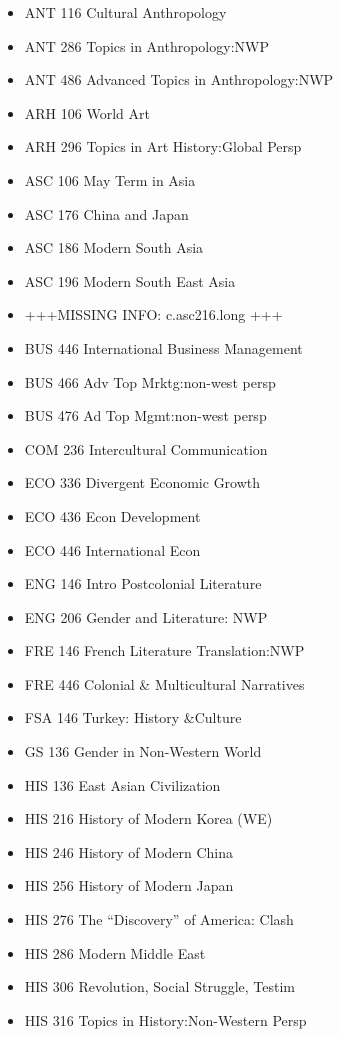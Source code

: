 \documentclass[
  letterpaper,
]{scrbook}
\providecommand{\tightlist}{%
  \setlength{\itemsep}{0pt}\setlength{\parskip}{0pt}}
\begin{document}
\begin{itemize}
\tightlist
\item
  ANT 116 Cultural Anthropology
\item
  ANT 286 Topics in Anthropology:NWP
\item
  ANT 486 Advanced Topics in Anthropology:NWP
\item
  ARH 106 World Art
\item
  ARH 296 Topics in Art History:Global Persp
\item
  ASC 106 May Term in Asia
\item
  ASC 176 China and Japan
\item
  ASC 186 Modern South Asia
\item
  ASC 196 Modern South East Asia
\item
  +++MISSING INFO: c.asc216.long +++
\item
  BUS 446 International Business Management
\item
  BUS 466 Adv Top Mrktg:non-west persp
\item
  BUS 476 Ad Top Mgmt:non-west persp
\item
  COM 236 Intercultural Communication
\item
  ECO 336 Divergent Economic Growth
\item
  ECO 436 Econ Development
\item
  ECO 446 International Econ
\item
  ENG 146 Intro Postcolonial Literature
\item
  ENG 206 Gender and Literature: NWP
\item
  FRE 146 French Literature Translation:NWP
\item
  FRE 446 Colonial \& Multicultural Narratives
\item
  FSA 146 Turkey: History \&Culture
\item
  GS 136 Gender in Non-Western World
\item
  HIS 136 East Asian Civilization
\item
  HIS 216 History of Modern Korea (WE)
\item
  HIS 246 History of Modern China
\item
  HIS 256 History of Modern Japan
\item
  HIS 276 The ``Discovery'' of America: Clash
\item
  HIS 286 Modern Middle East
\item
  HIS 306 Revolution, Social Struggle, Testim
\item
  HIS 316 Topics in History:Non-Western Persp

\end{itemize}
\end{document}
